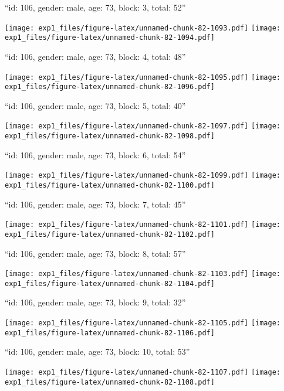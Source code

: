 \documentclass[11pt,,]{article}
\begin{document}
\newpage
[1] 

``id: 106, gender: male, age: 73, block: 3, total: 52''

\texttt{[image: exp1\_files/figure-latex/unnamed-chunk-82-1093.pdf]}
\texttt{[image: exp1\_files/figure-latex/unnamed-chunk-82-1094.pdf]}

\newpage
[1] 

``id: 106, gender: male, age: 73, block: 4, total: 48''

\texttt{[image: exp1\_files/figure-latex/unnamed-chunk-82-1095.pdf]}
\texttt{[image: exp1\_files/figure-latex/unnamed-chunk-82-1096.pdf]}

\newpage
[1] 

``id: 106, gender: male, age: 73, block: 5, total: 40''

\texttt{[image: exp1\_files/figure-latex/unnamed-chunk-82-1097.pdf]}
\texttt{[image: exp1\_files/figure-latex/unnamed-chunk-82-1098.pdf]}

\newpage
[1] 

``id: 106, gender: male, age: 73, block: 6, total: 54''

\texttt{[image: exp1\_files/figure-latex/unnamed-chunk-82-1099.pdf]}
\texttt{[image: exp1\_files/figure-latex/unnamed-chunk-82-1100.pdf]}

\newpage
[1] 

``id: 106, gender: male, age: 73, block: 7, total: 45''

\texttt{[image: exp1\_files/figure-latex/unnamed-chunk-82-1101.pdf]}
\texttt{[image: exp1\_files/figure-latex/unnamed-chunk-82-1102.pdf]}

\newpage
[1] 

``id: 106, gender: male, age: 73, block: 8, total: 57''

\texttt{[image: exp1\_files/figure-latex/unnamed-chunk-82-1103.pdf]}
\texttt{[image: exp1\_files/figure-latex/unnamed-chunk-82-1104.pdf]}

\newpage
[1] 

``id: 106, gender: male, age: 73, block: 9, total: 32''

\texttt{[image: exp1\_files/figure-latex/unnamed-chunk-82-1105.pdf]}
\texttt{[image: exp1\_files/figure-latex/unnamed-chunk-82-1106.pdf]}

\newpage
[1] 

``id: 106, gender: male, age: 73, block: 10, total: 53''

\texttt{[image: exp1\_files/figure-latex/unnamed-chunk-82-1107.pdf]}
\texttt{[image: exp1\_files/figure-latex/unnamed-chunk-82-1108.pdf]}
\end{document}
